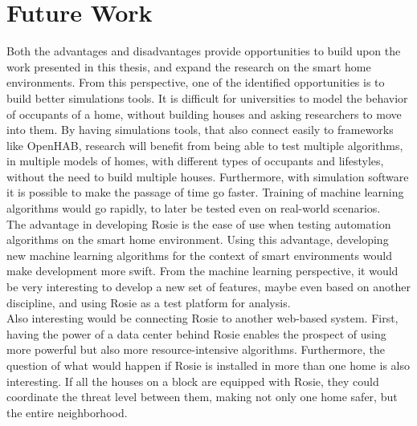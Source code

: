 \section{Future Work}
Both the advantages and disadvantages provide opportunities to build upon the work presented in this thesis, and expand the research on the smart home environments.
From this perspective, one of the identified opportunities is to build better simulations tools. It is difficult for universities to model the behavior of occupants of a home, without building houses and asking researchers to move into them. By having simulations tools, that also connect easily to frameworks like OpenHAB, research will benefit from being able to test multiple algorithms, in multiple models of homes, with different types of occupants and lifestyles, without the need to build multiple houses. Furthermore, with simulation software it is possible to make the passage of time go faster. Training of machine learning algorithms would go rapidly, to later be tested even on real-world 
scenarios. \\
The advantage in developing Rosie is the ease of use when testing automation algorithms on the smart home environment. Using this advantage, developing new machine learning algorithms for the context of smart environments would make development more swift.
From the machine learning perspective, it would be very interesting to develop a new set of features, maybe even based on another discipline, and using Rosie as a test platform for analysis. \\
Also interesting would be connecting Rosie to another web-based system. First, having the power of a data center behind Rosie enables the prospect of using more powerful but also more resource-intensive algorithms. Furthermore, the question of what would happen if Rosie is installed in more than one home is also interesting. If all the houses on a block are equipped with Rosie, they could coordinate the threat level between them, making not only one home safer, but the entire neighborhood.

